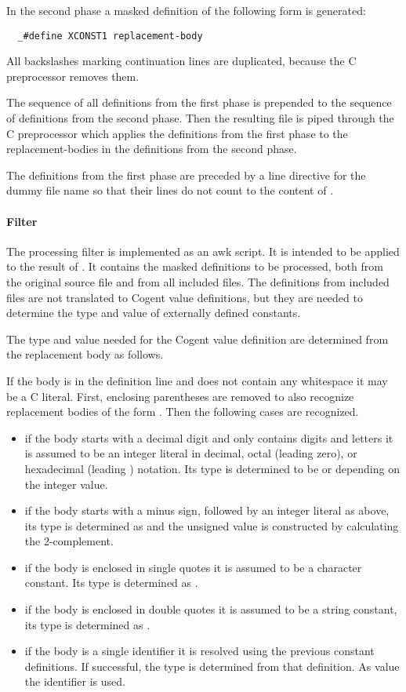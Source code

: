 In the second phase a masked definition of the following form is generated:
\begin{verbatim}
  _#define XCONST1 replacement-body
\end{verbatim}
All backslashes marking continuation lines are duplicated, because the C preprocessor removes them.

The sequence of all definitions from the first phase is prepended to the sequence of definitions from the second 
phase. Then the resulting file is piped through the C preprocessor
which applies the definitions from the first phase to the replacement-bodies in the definitions from the
second phase.

The definitions from the first phase are preceded by a line directive for the dummy file name 
so that their lines do not count to the content of .

\paragraph{Filter }

The processing filter is implemented as an awk script. It is intended to be applied to the result of 
. It contains the masked definitions to be processed, both from the original source file
and from all included files. The definitions from included files are not translated to Cogent value
definitions, but they are needed to determine the type and value of externally defined constants.

The type and value needed for the Cogent value definition are determined from the replacement body as follows.

If the body is in the definition line and does not contain any whitespace it may be a C literal. First, 
enclosing parentheses are removed to also recognize replacement bodies of the form . Then 
the following cases are recognized.
\begin{itemize}
\item if the body starts with a decimal digit and only contains digits and letters it is assumed to be an 
integer literal in decimal, octal (leading zero), or hexadecimal (leading ) notation. Its type
is determined to be  or  depending on the integer value.
\item if the body starts with a minus sign, followed by an integer literal as above, its type is
determined as  and the unsigned value is constructed by calculating the 2-complement.
\item if the body is enclosed in single quotes it is assumed to be a character constant. Its type is
determined as .
\item if the body is enclosed in double quotes it is assumed to be a string constant, its type is determined
as .
\item if the body is a single identifier it is resolved using the previous constant definitions. If successful,
the type is determined from that definition. As value the identifier is used.
\end{itemize}

